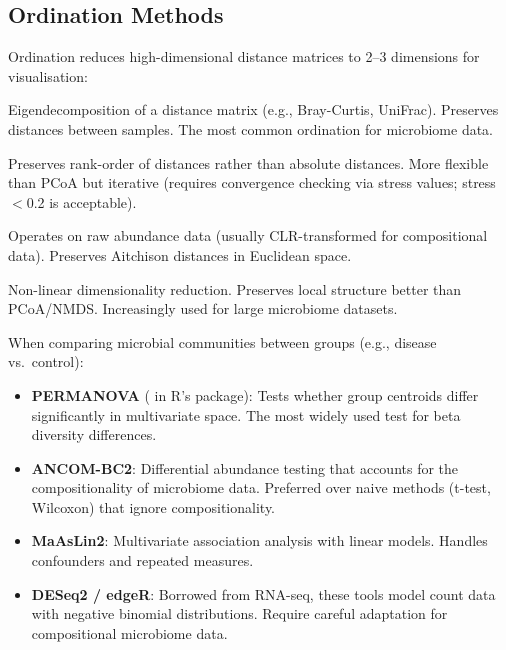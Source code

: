 \subsection{Ordination Methods}

Ordination reduces high-dimensional distance matrices to 2--3 dimensions for visualisation:

\begin{description}[style=nextline]
  \item[PCoA (Principal Coordinates Analysis)] Eigendecomposition of a distance matrix (e.g., Bray-Curtis, UniFrac). Preserves distances between samples. The most common ordination for microbiome data.
  \item[NMDS (Non-metric Multidimensional Scaling)] Preserves rank-order of distances rather than absolute distances. More flexible than PCoA but iterative (requires convergence checking via stress values; stress $<$0.2 is acceptable).
  \item[PCA (Principal Component Analysis)] Operates on raw abundance data (usually CLR-transformed for compositional data). Preserves Aitchison distances in Euclidean space.
  \item[UMAP] Non-linear dimensionality reduction. Preserves local structure better than PCoA/NMDS. Increasingly used for large microbiome datasets.
\end{description}

\begin{tipbox}[title={Statistical Testing for Microbiome Data}]
When comparing microbial communities between groups (e.g., disease vs.\ control):
\begin{itemize}[nosep]
  \item \textbf{PERMANOVA} ( in R's  package): Tests whether group centroids differ significantly in multivariate space. The most widely used test for beta diversity differences.
  \item \textbf{ANCOM-BC2}: Differential abundance testing that accounts for the compositionality of microbiome data. Preferred over naive methods (t-test, Wilcoxon) that ignore compositionality.
  \item \textbf{MaAsLin2}: Multivariate association analysis with linear models. Handles confounders and repeated measures.
  \item \textbf{DESeq2 / edgeR}: Borrowed from RNA-seq, these tools model count data with negative binomial distributions. Require careful adaptation for compositional microbiome data.
\end{itemize}
\end{tipbox}

